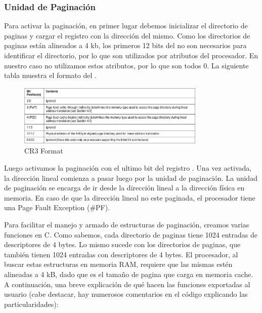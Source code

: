 \subsubsection{Unidad de Paginación}

Para activar la paginación, en primer lugar debemos inicializar el directorio de paginas y cargar el registro  con la dirección del mismo. Como los directorios de paginas están alineados a 4 kb, los primeros 12 bits del  no son necesarios para identificar el directorio, por lo que son utilizados por atributos del procesador. En nuestro caso no utilizamos estos atributos, por lo que son todos 0. La siguiente tabla muestra el formato del .

\begin{figure}[H]
  \centering
    \includegraphics[width=0.8\textwidth]{images/cr3}
  \caption{CR3 Format}
\end{figure}

Luego activamos la paginación con el ultimo bit del registro . Una vez activada, la dirección lineal comienza a pasar luego por la unidad de paginación. La unidad de paginación se encarga de ir desde la dirección lineal a la dirección física en memoria. En caso de que la dirección lineal no este paginada, el procesador tiene una Page Fault Exception (\#PF).

Para facilitar el manejo y armado de estructuras de paginación, creamos varias funciones en C. Como sabemos, cada directorio de paginas tiene 1024 entradas de descriptores de 4 bytes. Lo mismo sucede con los directorios de paginas, que también tienen 1024 entradas con descriptores de 4 bytes. El procesador, al buscar estas estructuras en memoria RAM, requiere que las mismas estén alineadas a 4 kB, dado que es el tamaño de pagina que carga en memoria cache. A continuación, una breve explicación de qué hacen las funciones exportadas al usuario (cabe destacar, hay numerosos comentarios en el código explicando las particularidades):


